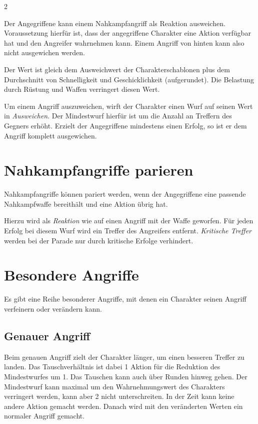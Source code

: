 \begin{multicols}{2}
\begin{pexample}[Beispiel]
Der Angegriffene kann einem Nahkampfangriff als Reaktion ausweichen. Voraussetzung hierfür ist, dass der angegriffene Charakter eine Aktion verfügbar hat und den Angreifer wahrnehmen kann. Einem Angriff von hinten kann also nicht ausgewichen werden.

Der Wert ist gleich dem Ausweichwert der Charakterschablonen plus dem Durchschnitt von Schnelligkeit und Geschicklichkeit (aufgerundet). Die Belastung durch Rüstung und Waffen verringert diesen Wert.

Um einem Angriff auszuweichen, wirft der Charakter einen Wurf auf seinen Wert in \textit{Ausweichen}. Der Mindestwurf hierfür ist um die Anzahl an Treffern des Gegners erhöht. Erzielt der Angegriffene mindestens einen Erfolg, so ist er dem Angriff komplett ausgewichen.

\section{Nahkampfangriffe parieren}

Nahkampfangriffe können pariert werden, wenn der Angegriffene eine passende Nahkampfwaffe bereithält und eine Aktion übrig hat.

Hierzu wird als \textit{Reaktion} wie auf einen Angriff mit der Waffe geworfen. Für jeden Erfolg bei diesem Wurf wird ein Treffer des Angreifers entfernt. \textit{Kritische Treffer} werden bei der Parade nur durch kritische Erfolge verhindert.

\section{Besondere Angriffe}

Es gibt eine Reihe besonderer Angriffe, mit denen ein Charakter seinen Angriff verfeinern oder verändern kann.

\subsection{Genauer Angriff}

Beim genauen Angriff zielt der Charakter länger, um einen besseren Treffer zu landen. Das Tauschverhältnis ist dabei 1 Aktion für die Reduktion des Mindestwurfes um 1. Das Tauschen kann auch über Runden hinweg gehen. Der Mindestwurf kann maximal um den Wahrnehmungswert des Charakters verringert werden, kann aber 2 nicht unterschreiten. In der Zeit kann keine andere Aktion gemacht werden. Danach wird mit den veränderten Werten ein normaler Angriff gemacht.


\end{pexample}
\end{multicols}
